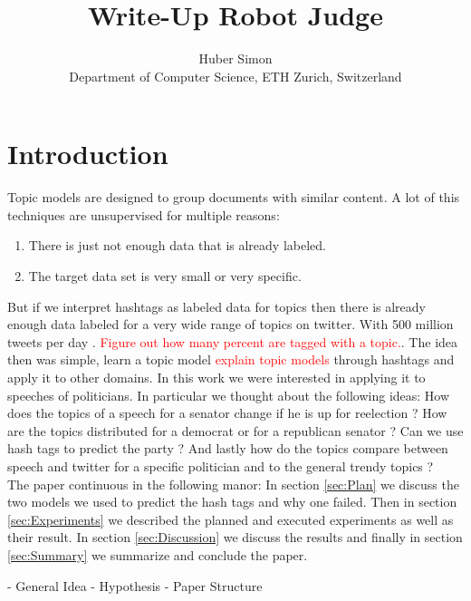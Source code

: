 \documentclass[10pt,conference,compsocconf]{IEEEtran}
\newcommand\todo[1]{\textcolor{red}{#1}}
\begin{document}
\title{Write-Up Robot Judge}

\author{
  Huber Simon\\
  Department of Computer Science, ETH Zurich, Switzerland
}

\maketitle

\begin{abstract}

\end{abstract}

\section{Introduction}
Topic models are designed to group documents with similar content. A lot of this techniques are unsupervised for multiple reasons: \begin{enumerate}
	\item There is just not enough data that is already labeled. 
	\item The target data set is very small or very specific. 
\end{enumerate} 
But if we interpret hashtags as labeled data for topics then there is already enough data labeled for a very wide range of topics on twitter. With 500 million tweets per day \cite{twitter_stats}. \todo{Figure out how many percent are tagged with a topic.}. The idea then was simple, learn a topic model \todo{explain topic models} through hashtags and apply it to other domains. In this work we were interested in applying it to speeches of politicians. In particular we thought about the following ideas: How does the topics of a speech for a senator change if he is up for reelection ? How are the topics distributed for a democrat or for a republican senator ? Can we use hash tags to predict the party ? And lastly how do the topics compare between speech and twitter for a specific politician and to the general trendy topics ? \\
The paper continuous in the following manor: In section \ref{sec:Plan} we discuss the two models we used to predict the hash tags and why one failed. Then in section \ref{sec:Experiments} we described the planned and executed experiments as well as their result. In section \ref{sec:Discussion} we discuss the results and finally in section \ref{sec:Summary} we summarize and conclude the paper. 

- General Idea
- Hypothesis 
- Paper Structure
\end{document}

